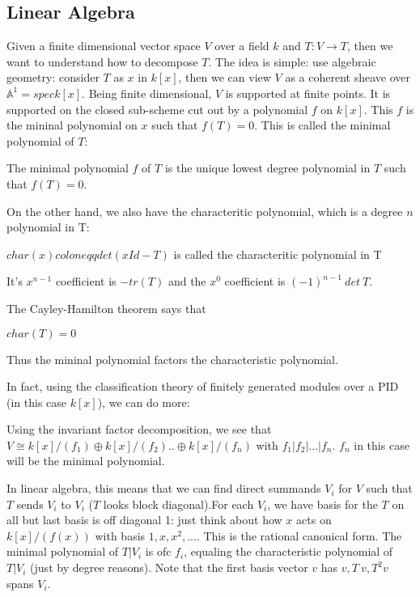 \documentclass[main.tex]{subfiles}
\begin{document}
\subsection{Linear Algebra}


Given a finite dimensional vector space $V$ over a field $k$ and $T: V \rightarrow T$, then we want to understand how to decompose $T$. The idea is simple: use algebraic geometry: consider $T$ as $x$ in $k[x]$, then we can view $V$ as a coherent sheave over $\mathbb{A}^1 = spec k[x]$. Being finite dimensional, $V$ is supported at finite points. It is supported on the closed sub-scheme cut out by a polynomial $f$ on $k[x]$. This $f$ is the mininal polynomial on $x$ such that $f(T) = 0$. This is called the minimal polynomial of $T$: 

\begin{definition}
The minimal polynomial $f$ of $T$ is the unique lowest degree polynomial in $T$ such that $f(T) = 0$.
\end{definition}

On the other hand, we also have the characteritic polynomial, which is a degree $n$ polynomial in T:
\begin{definition}
$char(x) coloneqq det (xId - T)$ is called the characteritic polynomial in T
\end{definition}

It's $x^{n-1}$ coefficient is $-tr(T)$ and the $x^0$ coefficient is $(-1)^{n-1} \ det \ T$. 

The Cayley-Hamilton theorem says that 
\begin{theorem}
$char(T) = 0$
\end{theorem}
Thus the mininal polynomial factors the characteristic polynomial.

In fact, using the classification theory of finitely generated modules over a PID (in this case $k[x]$), we can do more:

Using the invariant factor decomposition, we see that $V \cong k[x]/(f_1) \oplus k[x]/(f_2) .. \oplus k[x]/(f_n)$ with $f_1 | f_2 | ... | f_n$. $f_n$ in this case will be the minimal polynomial. 

In linear algebra, this means that we can find direct summands $V_i$ for $V$ such that $T$ sends $V_i$ to $V_i$ ($T$ looks block diagonal).For each $V_i$, we have basis for the $T$ on all but last basis is off diagonal 1: just think about how $x$ acts on $k[x]/(f(x))$ with basis $1, x, x^2, ...$. This is the rational canonical form. The minimal polynomial of $T|V_i$ is ofc $f_i$, equaling the characteristic polynomial of $T|V_i$ (just by degree reasons). Note that the first basis vector $v$ has $v, T\ v, T^2 v $ spans $V_i$.
\end{document}
